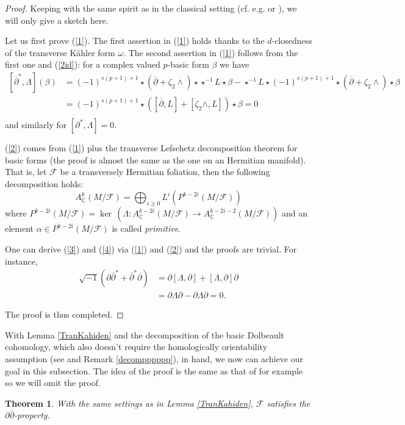 \documentclass[12pt]{amsart}
\numberwithin{equation}{section}
\newtheorem{theorem} {Theorem} [section]
\theoremstyle{definition}
\theoremstyle{definition}
\theoremstyle{definition}
\renewcommand{\1}{\mathsf{1}}
\renewcommand{\>}{\rightarrow}
\newcommand{\p}{\partial}
\newcommand{\bp}{\overline\partial}
\def\p{\partial}
\def\mb{\mathbb}
\def\mc{\mathcal}
\theoremstyle{plain} %
\theoremstyle{plain} %
\theoremstyle{plain} %
\begin{document}
	\begin{proof}
		Keeping with the same spirit as in the classical setting (cf. e.g. \cite[p. 111]{GH78} or \cite[Proposition 3.1.12]{Hb05}), we will only give  a sketch here.
		
		Let us first prove (\ref{1}). The first assertion in (\ref{1}) holds thanks to the $d$-closedness of the transverse K\"ahler form $\omega$.  The second assertion in (\ref{1}) follows from the first one and (\ref{2id}): for a complex valued $p$-basic form $\beta$ we have
		$$	\begin{aligned}
			[{\bp}^*,\Lambda](\beta) &= (-1)^{s(p+1)+1} {\star} (\bp+\zeta_2\wedge)\star\star^{-1}L\star\beta - \star^{-1}L\star(-1)^{s(p+1)+1} {\star} (\bp+\zeta_2\wedge)\star\beta \\
			&= (-1)^{s(p+1)+1}\star([\bp,L]+[\zeta_2\wedge,L])\star\beta= 0\\
		\end{aligned}$$
	and	similarly for $[\p^*,\Lambda]=0$.
		
		(\ref{2}) comes from (\ref{1}) plus the transverse Lefschetz decomposition theorem for basic forms (the proof is almost the same as the one on an Hermitian manifold). That is, let $\mc F$ be a transversely Hermitian foliation, then the following decomposition holds:
		$$A_\mb C^k(M/\mc F)=\bigoplus_{i\geq 0} L^i(P^{k-2i}(M/\mc F)) $$
		where $P^{k-2i}(M/\mc F)=\ker\, (\Lambda: A^{k-2i}_\mb C(M/\mc F)\rightarrow A^{k-2i-2}_\mb C(M/\mc F))$ and an element $\alpha\in P^{k-2i}(M/\mc F)$ is called \textit{primitive}.
		
		One can derive (\ref{3}) and (\ref{4}) via (\ref{1}) and (\ref{2}) and the proofs are trivial.
		For instance,
		$$\begin{aligned}
			\sqrt{-1}(\partial\bp^*+\bp^*\p)&=\p[\Lambda,\p]+[\Lambda,\p]\p\\
			&=\p\Lambda\p-\p\Lambda\p=0.
		\end{aligned}
		$$
		
		The proof is thus completed.
	\end{proof}
	
	With Lemma \ref{TranKahiden} and the decomposition of the basic Dolbeault cohomology, which also doesn't require the homologically orientability assumption (see \cite[Theorem 3.3.3]{EKA90} and Remark \ref{decompppppp}), in hand, we now can achieve our goal in this subsection. The idea of the proof is the same as that of  \cite[Corollary 3.2.10]{Hb05} for example so we will omit the proof.
	\begin{theorem}\label{ddbarnonho}
		With the same settings as in Lemma \ref{TranKahiden}, $\mc F$ satisfies the $\p\bp$-property.
	\end{theorem}
	
\end{document}
